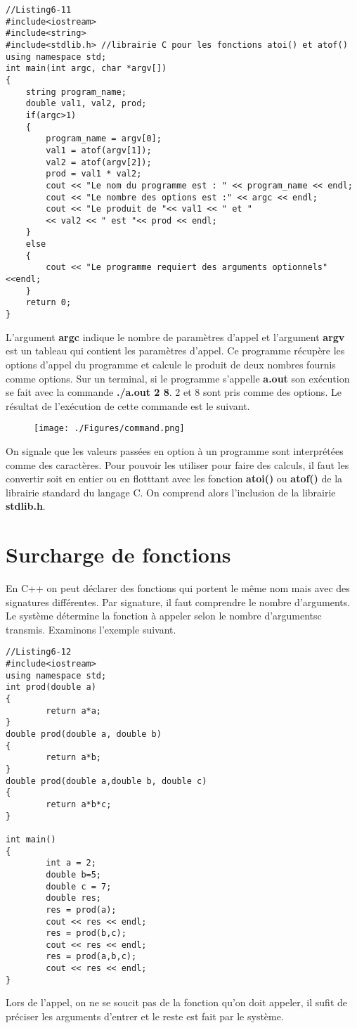 \documentclass[a4paper, oneside,11pt]{book}
\begin{document}
\begin{lstlisting}
//Listing6-11
#include<iostream>
#include<string>
#include<stdlib.h> //librairie C pour les fonctions atoi() et atof()
using namespace std;
int main(int argc, char *argv[])
{
    string program_name;
    double val1, val2, prod;
    if(argc>1)
    {
        program_name = argv[0];
        val1 = atof(argv[1]);
        val2 = atof(argv[2]);
        prod = val1 * val2;
        cout << "Le nom du programme est : " << program_name << endl;
        cout << "Le nombre des options est :" << argc << endl;
        cout << "Le produit de "<< val1 << " et " 
        << val2 << " est "<< prod << endl;
    }
    else
    {
        cout << "Le programme requiert des arguments optionnels" <<endl;
    }
    return 0;
}
\end{lstlisting}
L'argument \textbf{argc} indique le nombre de param\`etres d'appel et l'argument \textbf{argv} est un tableau qui contient les param\`etres d'appel.
Ce programme r\'ecup\`ere les options d'appel du programme et calcule le produit de deux nombres fournis comme options. Sur un terminal, si le programme 
s'appelle \textbf{a.out}
son ex\'ecution se fait avec la commande \textbf{./a.out 2 8}. 2 et 8 sont pris 
comme des options. Le r\'esultat de l'ex\'ecution de cette commande est le suivant.
\begin{figure}[hhhh]
\begin{center}
\texttt{[image: ./Figures/command.png]}
\end{center}
\end{figure}

On signale que les valeurs pass\'ees en option \`a un programme sont interpr\'et\'ees comme des caract\`eres.
Pour pouvoir les utiliser pour faire des calculs, il faut les convertir
soit en entier ou en flotttant avec les fonction \textbf{atoi()} ou \textbf{atof()} de la librairie standard du langage C. On comprend alors l'inclusion de la librairie 
\textbf{stdlib.h}.

\section{Surcharge de fonctions}

En C++ on peut d\'eclarer des fonctions qui portent le m\^eme nom mais avec des signatures diff\'erentes. Par signature, il faut 
comprendre le nombre d'arguments. Le syst\`eme d\'etermine la fonction \`a appeler selon le nombre d'argumentsc transmis. Examinons l'exemple suivant.
\begin{lstlisting}
//Listing6-12
#include<iostream>
using namespace std;
int prod(double a)
{
        return a*a;
}
double prod(double a, double b)
{
        return a*b;
}
double prod(double a,double b, double c)
{
        return a*b*c;
}

int main()
{
        int a = 2;
        double b=5;
        double c = 7;
        double res;
        res = prod(a);
        cout << res << endl;
        res = prod(b,c);
        cout << res << endl;
        res = prod(a,b,c);
        cout << res << endl;
}
\end{lstlisting}
Lors de l'appel, on ne se soucit pas de la fonction qu'on doit appeler, il sufit de pr\'eciser les arguments d'entrer et le reste est fait  par le syst\`eme.
\end{document}
